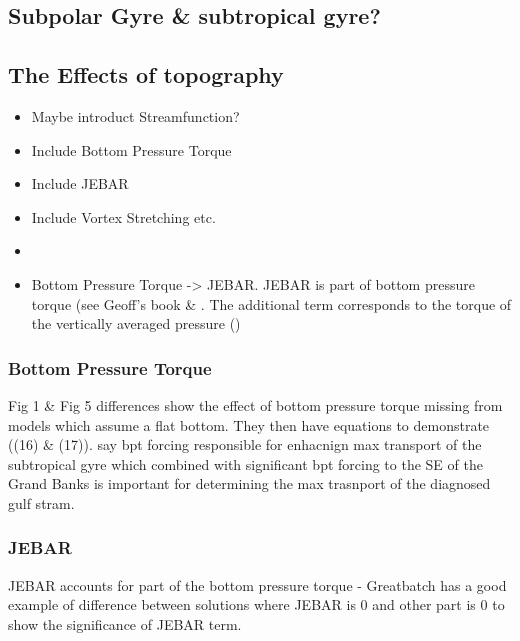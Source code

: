 \documentclass[..\EOYR.tex]{subfiles}
\begin{document}
\subsection{Subpolar Gyre \& subtropical gyre?}

\subsection{The Effects of topography}
\begin{itemize}
    \item Maybe introduct Streamfunction?
    \item Include Bottom Pressure Torque
    \item Include JEBAR
    \item Include Vortex Stretching etc. \citep{Zhang2007}
    \item \citep{Bell1999}
    \item Bottom Pressure Torque -> JEBAR. JEBAR is part of bottom pressure torque (see Geoff's book \& \citep{Greatbatch1991}. The additional term corresponds to the torque of the vertically averaged pressure (\citep{Greatbatch1991})
\end{itemize}

\subsubsection*{Bottom Pressure Torque}
\citep{Greatbatch1991} Fig 1 \& Fig 5 differences show the effect of bottom pressure torque missing from models which assume a flat bottom. They then have equations to demonstrate ((16) \& (17)). \citep{Greatbatch1991} say bpt forcing responsible for enhacnign max transport of the subtropical gyre which combined with significant bpt forcing to the SE of the Grand Banks is important for determining the max trasnport of the diagnosed gulf stram. \\

\subsubsection*{JEBAR}
\citep{Greatbatch1991} JEBAR accounts for part of the bottom pressure torque - Greatbatch has a good example of difference between solutions where JEBAR is 0 and other part is 0 to show the significance of JEBAR term.
\end{document}
